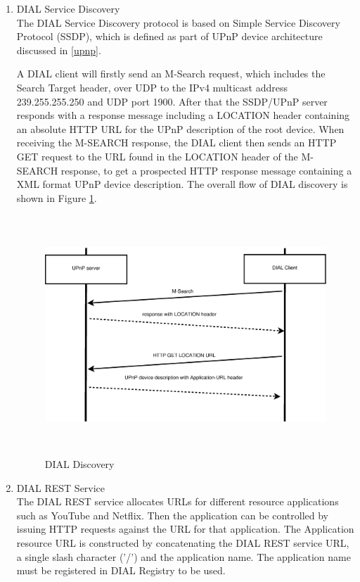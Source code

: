\begin{enumerate} 
\item DIAL Service Discovery \\ 
The DIAL Service Discovery protocol is based on Simple Service Discovery 
Protocol (SSDP), which is defined as part of UPnP device architecture discussed 
in \ref{upnp}. 

A DIAL client will firstly send an M-Search request, which includes  the Search Target 
header, over UDP to the IPv4 multicast address 239.255.255.250 and UDP port 1900. After that the SSDP/UPnP server responds with a response message including a LOCATION header 
containing an absolute HTTP URL for the UPnP description of the root device. 
When receiving the M-SEARCH response, the DIAL client then sends an HTTP GET 
request to the URL found in the LOCATION header of the M-SEARCH response, to 
get a prospected HTTP response message containing a XML format UPnP device description. The 
overall flow of DIAL discovery is shown in Figure \ref{dial_discovery}. 

\begin{figure}[htb] \centering 
\includegraphics[height=9cm]{charts/dial_discovery} 
\caption{DIAL Discovery \label{dial_discovery}} 
\end{figure} 

\item DIAL REST Service \\ 
The DIAL REST service allocates URLs for different resource applications such as 
YouTube and Netflix. Then the application can be controlled by issuing HTTP 
requests against the URL for that application. The Application resource URL is 
constructed by concatenating the DIAL REST service URL, a single slash character 
('/') and the application name. The application name must be registered in DIAL 
Registry to be used. 


\end{enumerate}

